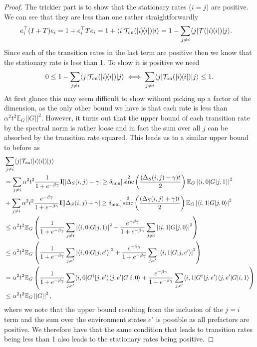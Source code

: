 \documentclass[
 amsmath,amssymb,
 aps,
onecolumn, 
nofootinbib]{revtex4-2}
\newcommand{\on}{\rm on}
\newcommand{\ket}[1]{|#1\rangle}
\newcommand{\bra}[1]{\langle #1|}
\newcommand{\ketbra}[2]{| #1\rangle\! \langle #2|}
\newcommand{\abs}[1]{\left| #1 \right|}
\newcommand{\norm}[1]{\left|\left| #1 \right|\right|}
\newcommand{\EE}{\mathbb{E}}
\DeclareMathOperator{\sinc}{sinc}
\begin{document}
\begin{proof}
The trickier part is to show that the stationary rates ($i = j$) are positive. We can see that they are less than one rather straightforwardly
\begin{align}
    e_i^\top (I + T) e_i &= 1 + e_i^\top T e_i = 1 + \bra{i} \mathcal{T}_{\on}(\ketbra{i}{i})\ket{i} = 1 - \sum_{j \neq i} \bra{j} \mathcal{T}(\ketbra{i}{i})\ket{j}.
\end{align}
Since each of the transition rates in the last term are positive then we know that the stationary rate is less than 1. To show it is positive we need 
\begin{align}
    0 \le 1 - \sum_{j \neq i} \bra{j} \mathcal{T}_{\on}(\ketbra{i}{i})\ket{j} \iff
    \sum_{j \neq i} \bra{j} \mathcal{T}_{\on}(\ketbra{i}{i}) \ket{j} \le 1.
\end{align}
At first glance this may seem difficult to show without picking up a factor of the dimension, as the only other bound we have is that each rate is less than $\alpha^2 t^2 \EE_G \norm{G}^2$. However, it turns out that the upper bound of each transition rate by the spectral norm is rather loose and in fact the sum over all $j$ can be absorbed by the transition rate squared. This leads us to a similar upper bound to before as
\begin{align}
    &\sum_{j \neq i} \bra{j}\mathcal{T}_{\on}(\ketbra{i}{i})\ket{j} \nonumber \\
    &= \sum_{j \neq i}\alpha^2 t^2 \frac{1}{1 + e^{-\beta \gamma}} \mathbf{I}[\abs{\Delta_S(i,j) - \gamma} \ge \delta_{\min}] \sinc^2 \left( \frac{(\Delta_S(i,j) - \gamma) t}{2}\right) \EE_G \abs{\bra{i,0} G \ket{j,1}}^2 \nonumber \\
    &+ \sum_{j \neq i}\alpha^2 t^2 \frac{e^{-\beta \gamma}}{1 + e^{-\beta \gamma}} \mathbf{I}[\abs{\Delta_S(i,j) + \gamma} \ge \delta_{\min}] \sinc^2 \left( \frac{(\Delta_S(i,j) + \gamma) t}{2}\right) \EE_G \abs{\bra{i,1} G \ket{j,0}}^2 \\
    &\le \alpha^2 t^2 \EE_G \left(\frac{1}{1 + e^{-\beta \gamma}} \sum_{j \neq i} \abs{\bra{i, 0} G \ket{j, 1}}^2 + \frac{e^{-\beta \gamma}}{1 + e^{-\beta \gamma}} \sum_{j \neq i} \abs{\bra{i, 1} G \ket{j, 0}}^2 \right) \\
    &\le \alpha^2 t^2 \EE_G \left(\frac{1}{1 + e^{-\beta \gamma}} \sum_{j, e'} \abs{\bra{i, 0} G \ket{j, e'}}^2 + \frac{e^{-\beta \gamma}}{1 + e^{-\beta \gamma}} \sum_{j, e'} \abs{\bra{i, 1} G \ket{j, e'}}^2 \right) \\
    &= \alpha^2 t^2 \EE_G \left(\frac{1}{1 + e^{-\beta \gamma}} \sum_{j, e'} \bra{i, 0} G^\dagger \ket{j, e'} \bra{j,e'} G \ket{i, 0} + \frac{e^{-\beta \gamma}}{1 + e^{-\beta \gamma}} \sum_{j, e'} \bra{i, 1} G^\dagger \ket{j, e'} \bra{j, e'} G \ket{i, 1} \right) \\
    &\le \alpha^2 t^2 \EE_G \norm{G}^2,
\end{align}
where we note that the upper bound resulting from the inclusion of the $j = i$ term and the sum over the environment states $e'$ is possible as all prefactors are positive. We therefore have that the same condition that leads to transition rates being less than 1 also leads to the stationary rates being positive.


\end{proof}
\end{document}
